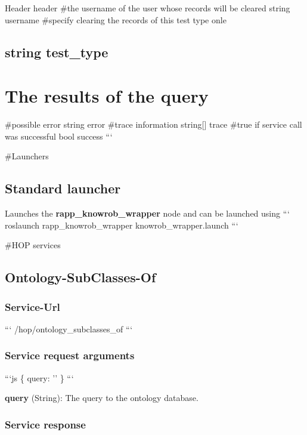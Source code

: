 Header header \#the username of the user whose records will be cleared string username \#specify clearing the records of this test type onle \subsection*{string test\-\_\-type }

\section*{The results of the query}

\#possible error string error \#trace information string\mbox{[}\mbox{]} trace \#true if service call was successful bool success ```

\#\-Launchers

\subsection*{Standard launcher}

Launches the {\bfseries rapp\-\_\-knowrob\-\_\-wrapper} node and can be launched using ``` roslaunch rapp\-\_\-knowrob\-\_\-wrapper knowrob\-\_\-wrapper.\-launch ```

\#\-H\-O\-P services

\subsection*{Ontology-\/\-Sub\-Classes-\/\-Of}

\subsubsection*{Service-\/\-Url}

``` /hop/ontology\-\_\-subclasses\-\_\-of ```

\subsubsection*{Service request arguments}

```js \{ query\-: '' \} ```
\begin{DoxyItemize}
\item {\bfseries query} (String)\-: The query to the ontology database.
\end{DoxyItemize}

\subsubsection*{Service response}


